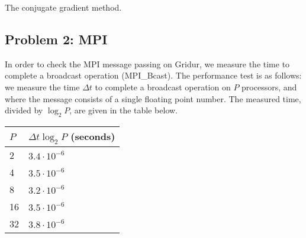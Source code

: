 \begin{algorithm}[H]
  \caption{The conjugate gradient method.}
\end{algorithm}





\subsection{Problem 2: MPI} %
\label{sub:problem_2_mpi}

\begin{question}
  In order to check the MPI message passing on Gridur, we measure the time to complete a broadcast operation (MPI\_Bcast). The performance test is as follows: we measure the time $\Delta t$ to complete a broadcast operation on $P$ processors, and where the message consists of a single floating point number.  The measured time, divided by $\log_2 P$, are given in the table below.

  \begin{center}
    \begin{tabular}{ll}
    \toprule
    $P$ & $\Delta t \log_2 P$ (seconds) \\
    \midrule
    2  & $3.4 \cdot 10^{-6}$ \\
    4  & $3.5 \cdot 10^{-6}$ \\
    8  & $3.2 \cdot 10^{-6}$ \\
    16 & $3.5 \cdot 10^{-6}$ \\
    32 & $3.8 \cdot 10^{-6}$ \\
    \bottomrule
    \end{tabular}
  \end{center}
\end{question}


